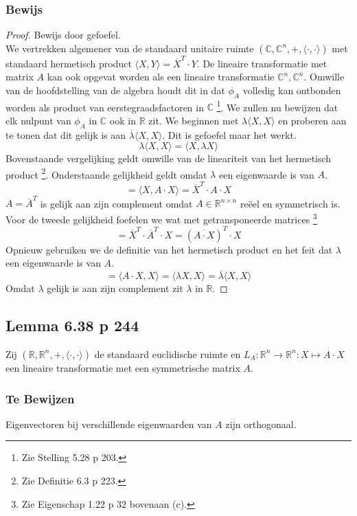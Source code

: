 \documentclass[lineaire_algebra_oplossingen.tex]{subfiles}
\begin{document}
\subsubsection*{Bewijs}
\begin{proof}
Bewijs door gefoefel.\\
We vertrekken algemener van de standaard unitaire ruimte $(\mathbb{C},\mathbb{C}^n,+,\langle \cdot , \cdot \rangle)$ met standaard hermetisch product $\langle X,Y\rangle = \overline{X}^T \cdot Y$. De lineaire transformatie met matrix $A$ kan ook opgevat worden als een lineaire transformatie $\mathbb{C}^n,\mathbb{C}^n$. Omwille van de hoofdstelling van de algebra houdt dit in dat $\phi_A$ volledig kan ontbonden worden als product van eerstegraadsfactoren in $\mathbb{C}$ \footnote{Zie Stelling 5.28 p 203.}.
We zullen nu bewijzen dat elk nulpunt van $\phi_A$ in $\mathbb{C}$ ook in $\mathbb{R}$ zit.
We beginnen met $\lambda \langle X , X \rangle$ en proberen aan te tonen dat dit gelijk is aan $\overline{\lambda} \langle X , X \rangle$. Dit is gefoefel maar het werkt. 
\[
\lambda \langle X , X \rangle = \langle X , \lambda X \rangle
\]
Bovenstaande vergelijking geldt omwille van de lineariteit van het hermetisch product \footnote{Zie Definitie 6.3 p 223.}.
Onderstaande gelijkheid geldt omdat $\lambda$ een eigenwaarde is van $A$.
\[
= \langle X , A \cdot X \rangle = \overline{X}^T \cdot A \cdot X
\]
$A = \overline{A}^T$ is gelijk aan zijn complement omdat $A \in \mathbb{R}^{n\times n}$ re\"eel en symmetrisch is. Voor de tweede gelijkheid foefelen we wat met getransponeerde matrices \footnote{Zie Eigenschap 1.22 p 32 bovenaan (c).}
\[
= \overline{X}^T \cdot \overline{A}^T \cdot X = (\overline{A \cdot X})^T \cdot X
\]
Opnieuw gebruiken we de definitie van het hermetisch product en het feit dat $\lambda$ een eigenwaarde is van $A$.
\[
= \langle  A \cdot X ,X \rangle =  \langle \lambda X , X \rangle = \overline{\lambda} \langle X , X \rangle
\]
Omdat $\lambda$ gelijk is aan zijn complement zit $\lambda$ in $\mathbb{R}$.
\end{proof}


\subsection{Lemma 6.38 p 244}
\label{6.38}
Zij $(\mathbb{R},\mathbb{R}^n,+,\langle \cdot , \cdot \rangle)$ de standaard euclidische ruimte en $L_A : \mathbb{R}^n \rightarrow \mathbb{R}^n: X \mapsto A \cdot X$ een lineaire transformatie met een symmetrische matrix $A$.
\subsubsection*{Te Bewijzen}
Eigenvectoren bij verschillende eigenwaarden van $A$ zijn orthogonaal.
\end{document}
